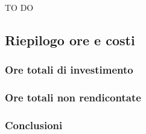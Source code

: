 			\noindent
			TO DO
		
	
	\subsection{Riepilogo ore e costi} %
	\label{sub:riepilogo_ore_e_costi}
		\subsubsection{Ore totali di investimento} %
		\label{ssub:ore_totali_di_investimento}
		
		
		\subsubsection{Ore totali non rendicontate} %
		\label{ssub:ore_totali_non_rendicontate}
		
		
		\subsubsection{Conclusioni} %
		\label{ssub:conclusioni}
		
		
	
